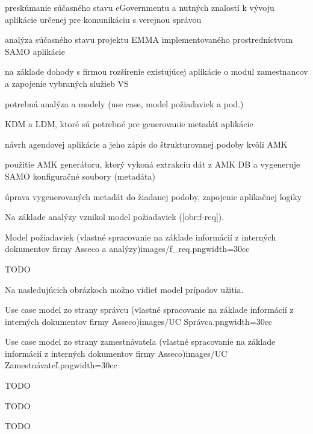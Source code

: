 
\startitemize[n]
\item{preskúmanie súčasného stavu eGovernmentu a nutných znalostí k vývoju aplikácie určenej pre komunikáciu s verejnou správou}
\item{analýza súčasného stavu projektu EMMA implementovaného prostredníctvom SAMO aplikácie}
\item{na základe dohody s firmou rozšírenie existujúcej aplikácie o modul zamestnancov a zapojenie vybraných služieb VS}
\startitemize[a]
\item{potrebná analýza a modely (use case, model požiadaviek a pod.)}
\item{KDM a LDM, ktoré sú potrebné pre generovanie metadát aplikácie}
\item{návrh agendovej aplikácie a jeho zápis do štrukturovanej podoby kvôli AMK}
\item{použitie AMK generátoru, ktorý vykoná extrakciu dát z AMK DB a vygeneruje SAMO konfiguračné soubory (metadáta)}
\item{úprava vygenerovaných metadát do žiadanej podoby, zapojenie aplikačnej logiky}
\stopitemize
\stopitemize

Na základe analýzy vznikol model požiadaviek ([obr:f-req]).

{Model požiadaviek (vlastné spracovanie na základe informácií z interných dokumentov firmy Asseco a analýzy)}{images/f_req.png}{width=30cc}

\TODO
TODO

Na nasledujúcich obrázkoch možno vidieť model prípadov užitia.

{Use case model zo strany správcu (vlastné spracovanie na základe informácií z interných dokumentov firmy Asseco)}{images/UC Správca.png}{width=30cc}

{Use case model zo strany zamestnávateľa (vlastné spracovanie na základe informácií z interných dokumentov firmy Asseco)}{images/UC Zamestnávateľ.png}{width=30cc}


\TODO
TODO


\TODO
TODO


\TODO
TODO



